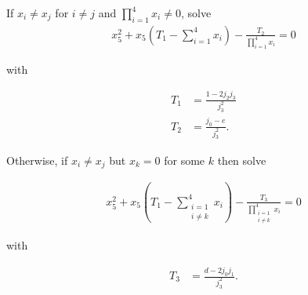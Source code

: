 \documentclass[ngerman,11pt,a4paper]{article}
\begin{document}
If $x_i \neq x_j$ for $i \neq j$ and $\prod_{i=1}^4 x_i \neq 0$, solve
\begin{align*}
  x_5^2+x_5(T_1-\sum_{i=1}^4 x_i) - \frac{T_2}{\prod_{i=1}^4 x_i} = 0
\end{align*}

with

\begin{align*}
  T_1 &= \frac{1-2j_2 j_3}{j_3^2}\\
  T_2 &= \frac{j_0-e}{j_3^2}.
\end{align*}

Otherwise, if $x_i \neq x_j$ but $x_k = 0$ for some $k$ then solve

\begin{align*}
  x_5^2+x_5(T_1-\sum_{\substack{i=1 \\ i \neq k}}^4 x_i) - \frac{T_3}{\prod_{\substack{i=1 \\ i \neq k}}^4 x_i} = 0
\end{align*}

with

\begin{align*}
  T_3 &= \frac{d-2 j_0 j_1}{j_3^2}.
\end{align*}
\end{document}

